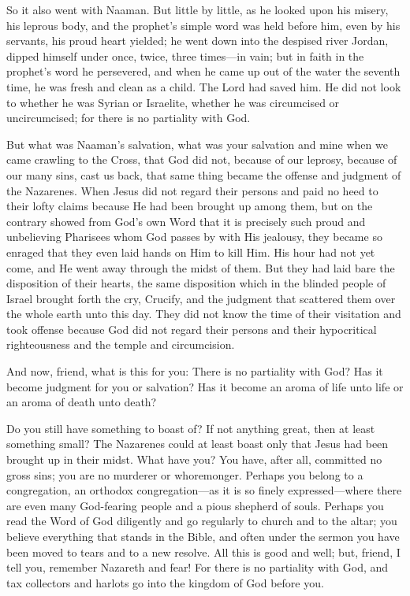 So it also went with Naaman. But little by little, as he looked upon his misery, his leprous body, and the prophet’s simple word was held before him, even by his servants, his proud heart yielded; he went down into the despised river Jordan, dipped himself under once, twice, three times—in vain; but in faith in the prophet’s word he persevered, and when he came up out of the water the seventh time, he was fresh and clean as a child. The Lord had saved him. He did not look to whether he was Syrian or Israelite, whether he was circumcised or uncircumcised; for there is no partiality with God.

But what was Naaman’s salvation, what was your salvation and mine when we came crawling to the Cross, that God did not, because of our leprosy, because of our many sins, cast us back, that same thing became the offense and judgment of the Nazarenes. When Jesus did not regard their persons and paid no heed to their lofty claims because He had been brought up among them, but on the contrary showed from God’s own Word that it is precisely such proud and unbelieving Pharisees whom God passes by with His jealousy, they became so enraged that they even laid hands on Him to kill Him. His hour had not yet come, and He went away through the midst of them. But they had laid bare the disposition of their hearts, the same disposition which in the blinded people of Israel brought forth the cry, Crucify, and the judgment that scattered them over the whole earth unto this day. They did not know the time of their visitation and took offense because God did not regard their persons and their hypocritical righteousness and the temple and circumcision.

And now, friend, what is this for you: There is no partiality with God? Has it become judgment for you or salvation? Has it become an aroma of life unto life or an aroma of death unto death?

Do you still have something to boast of? If not anything great, then at least something small? The Nazarenes could at least boast only that Jesus had been brought up in their midst. What have you? You have, after all, committed no gross sins; you are no murderer or whoremonger. Perhaps you belong to a congregation, an orthodox congregation—as it is so finely expressed—where there are even many God-fearing people and a pious shepherd of souls. Perhaps you read the Word of God diligently and go regularly to church and to the altar; you believe everything that stands in the Bible, and often under the sermon you have been moved to tears and to a new resolve. All this is good and well; but, friend, I tell you, remember Nazareth and fear! For there is no partiality with God, and tax collectors and harlots go into the kingdom of God before you.

